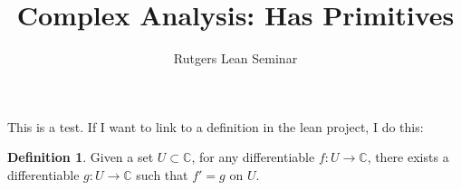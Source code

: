 \documentclass{report}
\title{Complex Analysis: Has Primitives}
\author{Rutgers Lean Seminar}
\theoremstyle{definition}
\newtheorem{definition}{Definition}
\begin{document}
\maketitle

This is a test.
If I want to link to a definition in the lean project, I do this:
\begin{definition}
  \label{def:has_primitives}
  Given a set $U\subset\mathbb C$, for any differentiable $f:U\to\mathbb C$, there exists a differentiable $g:U\to\mathbb C$ such that $f'=g$ on $U$.
\end{definition}
\end{document}

